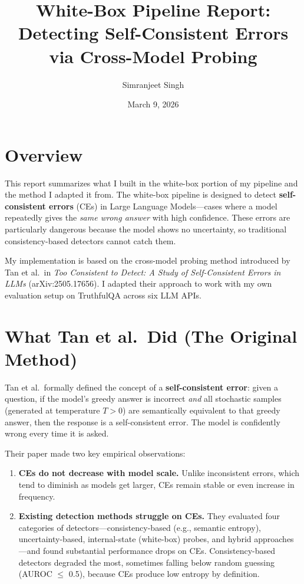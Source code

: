 \documentclass[11pt]{article}
\title{White-Box Pipeline Report:\\
Detecting Self-Consistent Errors via Cross-Model Probing}
\author{Simranjeet Singh}
\date{March 9, 2026}
\begin{document}
\maketitle

\section{Overview}

This report summarizes what I built in the white-box portion of my pipeline and the method I adapted it from. The white-box pipeline is designed to detect \textbf{self-consistent errors} (CEs) in Large Language Models---cases where a model repeatedly gives the \emph{same wrong answer} with high confidence. These errors are particularly dangerous because the model shows no uncertainty, so traditional consistency-based detectors cannot catch them.

My implementation is based on the cross-model probing method introduced by Tan et al.\ in \emph{Too Consistent to Detect: A Study of Self-Consistent Errors in LLMs} (arXiv:2505.17656). I adapted their approach to work with my own evaluation setup on TruthfulQA across six LLM APIs.

\section{What Tan et al.\ Did (The Original Method)}

Tan et al.\ formally defined the concept of a \textbf{self-consistent error}: given a question, if the model's greedy answer is incorrect \emph{and} all stochastic samples (generated at temperature $T > 0$) are semantically equivalent to that greedy answer, then the response is a self-consistent error. The model is confidently wrong every time it is asked.

Their paper made two key empirical observations:
\begin{enumerate}
    \item \textbf{CEs do not decrease with model scale.} Unlike inconsistent errors, which tend to diminish as models get larger, CEs remain stable or even increase in frequency.
    \item \textbf{Existing detection methods struggle on CEs.} They evaluated four categories of detectors---consistency-based (e.g., semantic entropy), uncertainty-based, internal-state (white-box) probes, and hybrid approaches---and found substantial performance drops on CEs. Consistency-based detectors degraded the most, sometimes falling below random guessing (AUROC $\leq$ 0.5), because CEs produce low entropy by definition.
\end{enumerate}
\end{document}
